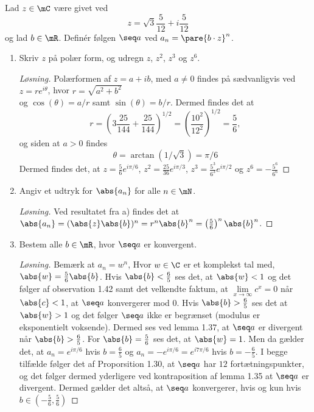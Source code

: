\setcounter{section}{1}
\begin{opg}
Lad $z\in\mC$ være givet ved
$$ z = \sqrt{3}\frac{5}{12}+i\frac{5}{12} $$
og lad $b\in\mR$. Definér følgen $\seq a$ ved $a_n = \pare{b\cdot z}^n$.
\begin{enumerate}
    \item Skriv $z$ på polær form, og udregn $z$, $z^2$, $z^3$ og $z^6$. 
    \begin{proof}[Løsning]
    	Polærformen af $ z=a+ib $, med $ a\neq0 $ findes på sædvanligvis ved $ z=re^{i\theta} $, hvor $ r=\sqrt{a^2+b^2} $\\ og $ \cos(\theta)=a/r $ samt $ \sin(\theta)=b/r $. Dermed findes det at \begin{equation*}
    		r=\left(3\frac{25}{144}+\frac{25}{144}\right)^{1/2}=\left(\frac{10^2}{12^2}\right)^{1/2}=\frac{5}{6},
    	\end{equation*}
    	og siden at $ a>0 $ findes \begin{equation*}
    	\theta=\arctan(1/\sqrt{3})=\pi/6
    	\end{equation*}
    	Dermed findes det, at $ z=\frac{5}{6}e^{i\pi/6} $, $ z^2=\frac{25}{36}e^{i\pi/3} $, $ z^3=\frac{5^3}{6^3}e^{i\pi/2} $ og $ z^6=-\frac{5^6}{6^6} $
    \end{proof}
    
    
    \item Angiv et udtryk for $\abs{a_n}$ for alle $n\in\mN$.
    \begin{proof}[Løsning]
    	Ved resultatet fra a) findes det at $ \abs{a_n}=(\abs{z}\abs{b})^n=r^n\abs{b}^n=\left(\frac{5}{6}\right)^n\abs{b}^n $.
    \end{proof}

    
    
    \item Bestem alle $b\in\mR$, hvor $\seq a$ er konvergent.
    \begin{proof}[Løsning]
    	Bemærk at $ a_n=w^n $, Hvor $ w\in\C $ er et komplekst tal med, $ \abs{w}=\frac{5}{6}\abs{b} $. Hvis $ \abs{b}<\frac{6}{5} $ ses det, at $ \abs{w}<1 $ og det følger af observation 1.42 samt det velkendte faktum, at $ \lim\limits_{x\to\infty}c^x=0 $ når $ \abs{c}<1 $, at $ \seq a $ konvergerer mod 0. Hvis $ \abs{b}>\frac{6}{5} $ ses det at $ \abs{w}>1 $ og det følger $ \seq a $ ikke er begrænset (modulus er eksponentielt voksende). Dermed ses ved lemma 1.37, at $ \seq a $ er divergent når $ \abs{b}>\frac{6}{5} $. For $ \abs{b}=\frac{5}{6} $ ses det, at $ \abs{w}=1 $. Men da gælder det, at $ a_n=e^{i\pi/6} $ hvis $ b=\frac{6}{5} $ og $ a_n=-e^{i\pi/6}=e^{i7\pi/6} $ hvis $ b=-\frac{6}{5} $. I begge tilfælde følger det af Proporsition 1.30, at $ \seq a $ har $ 12 $ fortætningspunkter, og det følger dermed yderligere ved kontraposition af lemma 1.35 at $ \seq a $ er divergent. Dermed gælder det altså, at $ \seq a $ konvergerer, hvis og kun hvis $ b\in\left(-\frac{5}{6},\frac{5}{6}\right) $
    \end{proof}
    

\end{enumerate}
\end{opg}
